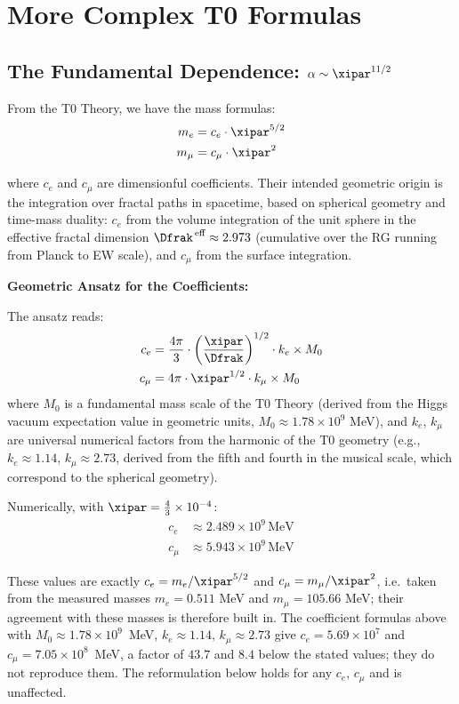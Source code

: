 	\section{More Complex T0 Formulas}
	
	\subsection{The Fundamental Dependence: $\alpha \sim \xipar^{11/2}$}
	
	From the T0 Theory, we have the mass formulas:
	\begin{align}
		m_e &= c_e \cdot \xipar^{5/2} \\
		m_\mu &= c_\mu \cdot \xipar^2
	\end{align}
	
	where $c_e$ and $c_\mu$ are dimensionful coefficients. Their intended geometric origin is the integration over fractal paths in spacetime, based on spherical geometry and time-mass duality: $c_e$ from the volume integration of the unit sphere in the effective fractal dimension $\Dfrak^{\,\text{eff}} \approx 2.973$ (cumulative over the RG running from Planck to EW scale), and $c_\mu$ from the surface integration.
	
	\textbf{Geometric Ansatz for the Coefficients:}
	
	The ansatz reads:
	\begin{align}
		c_e &= \frac{4\pi}{3} \cdot \left(\frac{\xipar}{\Dfrak}\right)^{1/2} \cdot k_e \times M_0 \\
		c_\mu &= 4\pi \cdot \xipar^{1/2} \cdot k_\mu \times M_0
	\end{align}
	where $M_0$ is a fundamental mass scale of the T0 Theory (derived from the Higgs vacuum expectation value in geometric units, $M_0 \approx 1.78 \times 10^9$ MeV), and $k_e$, $k_\mu$ are universal numerical factors from the harmonic of the T0 geometry (e.g., $k_e \approx 1.14$, $k_\mu \approx 2.73$, derived from the fifth and fourth in the musical scale, which correspond to the spherical geometry).
	
	Numerically, with $\xipar = \frac{4}{3} \times 10^{-4}$:
	\begin{align}
		c_e &\approx 2.489 \times 10^9 \, \text{MeV} \\
		c_\mu &\approx 5.943 \times 10^9 \, \text{MeV}
	\end{align}
	
	These values are exactly $c_e = m_e/\xipar^{5/2}$ and $c_\mu = m_\mu/\xipar^2$, i.e.\ taken from the measured masses $m_e = 0.511$ MeV and $m_\mu = 105.66$ MeV; their agreement with these masses is therefore built in. The coefficient formulas above with $M_0 \approx 1.78 \times 10^9$~MeV, $k_e \approx 1.14$, $k_\mu \approx 2.73$ give $c_e = 5.69 \times 10^7$ and $c_\mu = 7.05 \times 10^8$~MeV, a factor of $43.7$ and $8.4$ below the stated values; they do not reproduce them. The reformulation below holds for any $c_e$, $c_\mu$ and is unaffected.

